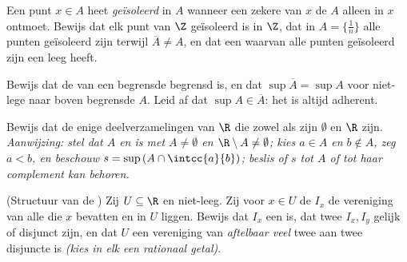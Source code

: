 \begin{exercise}[$\star\star$]\label{exo:b1:topology:7}
Een punt $x \in A$ heet \emph{geïsoleerd} in $A$ wanneer een zekere
 van $x$ de  $A$ alleen in $x$ ontmoet. Bewijs dat elk
punt van $\Z$ geïsoleerd is in $\Z$, dat in $A = \{\frac1n\}$ alle punten
geïsoleerd zijn terwijl $\overline A \neq A$, en dat een 
waarvan alle punten geïsoleerd zijn een leeg  heeft.
\end{exercise}

\begin{exercise}[$\star\star$]\label{exo:b1:topology:8}
Bewijs dat de  van een begrensde  begrensd is, en
dat $\sup \overline A = \sup A$ voor niet-lege naar boven begrensde $A$.
Leid af dat $\sup A \in \overline A$: het  is altijd adherent.
\end{exercise}

\begin{exercise}[$\star\star\star$]\label{exo:b1:topology:9}
Bewijs dat de enige deelverzamelingen van $\R$ die zowel  als
 zijn $\emptyset$ en $\R$ zijn. \emph{Aanwijzing: stel dat $A$
 en  is met $A \neq \emptyset$ en $\R \setminus A \neq
\emptyset$; kies $a \in A$ en $b \notin A$, zeg $a < b$, en beschouw $s =
\sup\,(A \cap \intcc{a}{b})$; beslis of $s$ tot $A$ of tot haar
complement kan behoren.}
\end{exercise}

\begin{exercise}[$\star\star\star$]\label{exo:b1:topology:10}
(Structuur van de ) Zij $U \subseteq \R$  en
niet-leeg. Zij voor $x \in U$ de  $I_x$ de vereniging van alle
  die $x$ bevatten en in $U$ liggen. Bewijs dat $I_x$ een
  is, dat twee  $I_x, I_y$ gelijk of disjunct
zijn, en dat $U$ een vereniging van \emph{aftelbaar veel} twee aan twee
disjuncte   is \emph{(kies in elk een rationaal getal)}.
\end{exercise}

